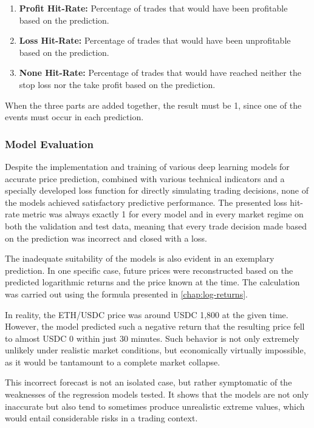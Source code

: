 \begin{enumerate}
    \item \textbf{Profit Hit-Rate:} Percentage of trades that would have been profitable based on the prediction.
    \item \textbf{Loss Hit-Rate:} Percentage of trades that would have been unprofitable based on the prediction.
    \item \textbf{None Hit-Rate:} Percentage of trades that would have reached neither the stop loss nor the take profit based on the prediction.
\end{enumerate}

When the three parts are added together, the result must be 1, since one of the events must occur in each prediction.

\subsubsection{Model Evaluation}

Despite the implementation and training of various deep learning models for accurate price prediction, combined with various technical indicators and a specially developed loss function for directly simulating trading decisions, none of the models achieved satisfactory predictive performance.
The presented loss hit-rate metric was always exactly 1 for every model and in every market regime on both the validation and test data, meaning that every trade decision made based on the prediction was incorrect and closed with a loss.

The inadequate suitability of the models is also evident in an exemplary prediction.
In one specific case, future prices were reconstructed based on the predicted logarithmic returns and the price known at the time.
The calculation was carried out using the formula presented in \autoref{chap:log-returns}.

In reality, the ETH/USDC price was around USDC 1,800 at the given time.
However, the model predicted such a negative return that the resulting price fell to almost USDC 0 within just 30 minutes.
Such behavior is not only extremely unlikely under realistic market conditions, but economically virtually impossible, as it would be tantamount to a complete market collapse.

This incorrect forecast is not an isolated case, but rather symptomatic of the weaknesses of the regression models tested.
It shows that the models are not only inaccurate but also tend to sometimes produce unrealistic extreme values, which would entail considerable risks in a trading context.

